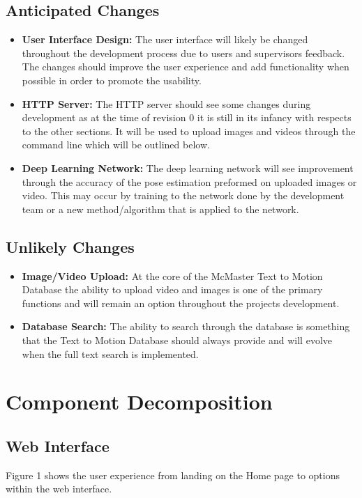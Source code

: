 \documentclass{scrreprt}
\begin{document}
\section{Anticipated Changes}
  \begin{itemize}
    \item \textbf {User Interface Design:} The user interface will likely be changed throughout the development process due to users and supervisors feedback. The changes should improve the user experience and add functionality when possible in order to promote the usability.
    \item \textbf {HTTP Server:} The HTTP server should see some changes during development as at the time of revision 0 it is still in its infancy with respects to the other sections. It will be used to upload images and videos through the command line which will be outlined below.
    \item \textbf{Deep Learning Network:} The deep learning network will see improvement through the accuracy of the pose estimation preformed on uploaded images or video. This may occur by training to the network done by the development team or a new method/algorithm that is applied to the network.
  \end{itemize}

\section{Unlikely Changes}
  \begin{itemize}
    \item \textbf {Image/Video Upload:} At the core of the McMaster Text to Motion Database the ability to upload video and images is one of the primary functions and will remain an option throughout the projects development.
    \item \textbf {Database Search:} The ability to search through the database is something that the Text to Motion Database should always provide and will evolve when the full text search is implemented.
  \end{itemize}

\chapter{Component Decomposition}

\section{Web Interface}
Figure 1 shows the user experience from landing on the Home page to options within the web interface.
\end{document}
